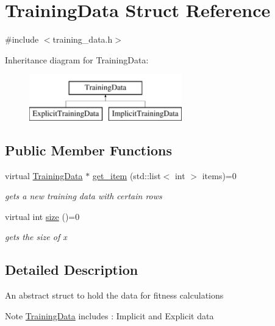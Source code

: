 \hypertarget{structTrainingData}{}\section{Training\+Data Struct Reference}
\label{structTrainingData}


{\ttfamily \#include $<$training\+\_\+data.\+h$>$}

Inheritance diagram for Training\+Data\+:\begin{figure}[H]
\begin{center}
\leavevmode
\includegraphics[height=2.000000cm]{structTrainingData}
\end{center}
\end{figure}
\subsection*{Public Member Functions}
\begin{DoxyCompactItemize}
\item 
virtual \hyperlink{structTrainingData}{Training\+Data} $\ast$ \hyperlink{structTrainingData_a96ef790e9e78909f84ce83692c7faced}{get\+\_\+item} (std\+::list$<$ int $>$ items)=0
\begin{DoxyCompactList}\small\item\em gets a new training data with certain rows \end{DoxyCompactList}\item 
virtual int \hyperlink{structTrainingData_a9be21e878961cc347e6820eb34db0a1b}{size} ()=0
\begin{DoxyCompactList}\small\item\em gets the size of x \end{DoxyCompactList}\end{DoxyCompactItemize}


\subsection{Detailed Description}
An abstract struct to hold the data for fitness calculations

\begin{DoxyNote}{Note}
\hyperlink{structTrainingData}{Training\+Data} includes \+: Implicit and Explicit data 
\end{DoxyNote}


